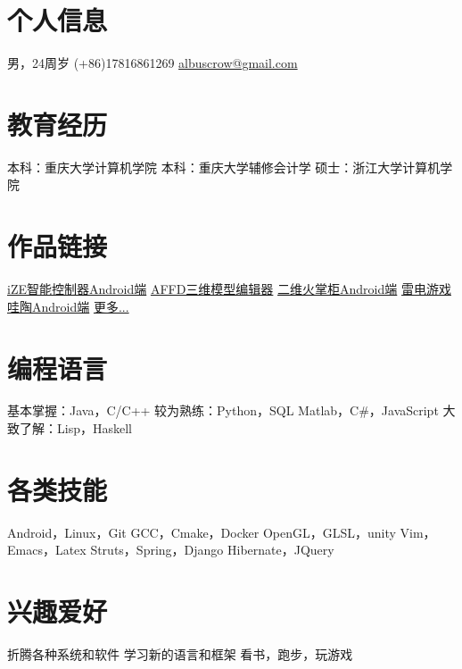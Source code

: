 \documentclass[]{friggeri-cv_cn} %
\begin{document}


\begin{aside} %
\section{个人信息}
男，24周岁
(+86)17816861269
\href{mailto:albuscrow@gmail.com}{albuscrow@gmail.com}
\section{教育经历}
本科：重庆大学计算机学院
本科：重庆大学辅修会计学
硕士：浙江大学计算机学院
\section{作品链接}
\href{http://www.hisensehitachi.com/jstx/index.aspx?nodeid=1162}{iZE智能控制器Android端}
\href{https://github.com/albuscrow/AFFD}{AFFD三维模型编辑器}
\href{http://www.jinxizi.cn/android/huozhanggui.html}{二维火掌柜Android端}
\href{https://github.com/albuscrow/learn_unity}{雷电游戏}
\href{http://36kr.com/p/5043478.html}{哇陶Android端}
\href{https://github.com/albuscrow}{更多...}
\section{编程语言}
基本掌握：Java，C/C++
较为熟练：Python，SQL Matlab，C\#，JavaScript
大致了解：Lisp，Haskell
\section{各类技能}
Android，Linux，Git
GCC，Cmake，Docker
OpenGL，GLSL，unity
Vim，Emacs，Latex
Struts，Spring，Django
Hibernate，JQuery
\section{兴趣爱好}
折腾各种系统和软件
学习新的语言和框架
看书，跑步，玩游戏
\end{aside}
\end{document}
